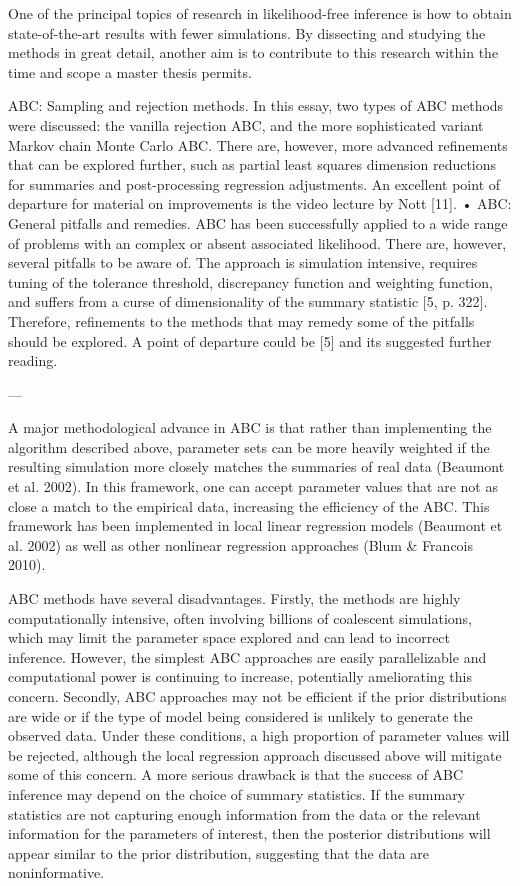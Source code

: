 One of the principal topics of research in likelihood-free inference is how to obtain state-of-the-art results with fewer simulations. By dissecting and studying the methods in great detail, another aim is to contribute to this research within the time and scope a master thesis permits. 

ABC: Sampling and rejection methods. In this essay, two types of ABC methods were discussed: the vanilla rejection ABC, and the more sophisticated variant Markov chain Monte Carlo ABC. There are, however, more advanced refinements that can be explored further, such as partial least squares dimension reductions for summaries and post-processing regression adjustments. An excellent point of departure for material on improvements is the video lecture by Nott [11].
• ABC: General pitfalls and remedies. ABC has been successfully applied to a wide range of problems with an complex or absent associated likelihood. There are, however, several pitfalls to be aware of. The approach is simulation intensive, requires tuning of the tolerance threshold, discrepancy function and weighting function, and suffers from a curse of dimensionality of the summary statistic [5, p. 322]. Therefore, refinements to the methods that may remedy some of the pitfalls should be explored. A point of departure could be [5] and its suggested further reading. 

---

A major methodological advance in ABC is that rather than implementing the algorithm described above, parameter sets can be more heavily weighted if the resulting simulation more closely matches the summaries of real data (Beaumont et al. 2002). In this framework, one can accept parameter values that are not as close a match to the empirical data, increasing the efficiency of the ABC. This framework has been implemented in local linear regression models (Beaumont et al. 2002) as well as other nonlinear regression approaches (Blum \& Francois 2010). 

ABC methods have several disadvantages. Firstly, the methods are highly computationally intensive, often involving billions of coalescent simulations, which may limit the parameter space explored and can lead to incorrect inference. However, the simplest ABC approaches are easily parallelizable and computational power is continuing to increase, potentially ameliorating this concern. Secondly, ABC approaches may not be efficient if the prior distributions are wide or if the type of model being considered is unlikely to generate the observed data. Under these conditions, a high proportion of parameter values will be rejected, although the local regression  approach discussed above will mitigate some of this concern. A more serious drawback is that the success of ABC inference may depend on the choice of summary statistics. If the summary statistics are not capturing enough information from the data or the relevant information for the parameters of interest, then the posterior distributions will appear similar to the prior distribution, suggesting that the data are noninformative. 


